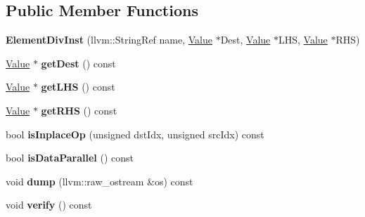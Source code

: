 \subsection*{Public Member Functions}
\begin{DoxyCompactItemize}
\item 
\mbox{\label{classglow_1_1_element_div_inst_ad0362c7e59fc139eaddf59c1a1543f28}} 
{\bfseries Element\+Div\+Inst} (llvm\+::\+String\+Ref name, \hyperlink{classglow_1_1_value}{Value} $\ast$Dest, \hyperlink{classglow_1_1_value}{Value} $\ast$L\+HS, \hyperlink{classglow_1_1_value}{Value} $\ast$R\+HS)
\item 
\mbox{\label{classglow_1_1_element_div_inst_a90fd08376f2deead72e2eb4b32d5426d}} 
\hyperlink{classglow_1_1_value}{Value} $\ast$ {\bfseries get\+Dest} () const
\item 
\mbox{\label{classglow_1_1_element_div_inst_ae241f42b7355bcf914e9592b4ee34b86}} 
\hyperlink{classglow_1_1_value}{Value} $\ast$ {\bfseries get\+L\+HS} () const
\item 
\mbox{\label{classglow_1_1_element_div_inst_a428924934a32c03ae303f97fc949d8ce}} 
\hyperlink{classglow_1_1_value}{Value} $\ast$ {\bfseries get\+R\+HS} () const
\item 
\mbox{\label{classglow_1_1_element_div_inst_a83f3cb9bf30f616b945cbd6c8ce4212e}} 
bool {\bfseries is\+Inplace\+Op} (unsigned dst\+Idx, unsigned src\+Idx) const
\item 
\mbox{\label{classglow_1_1_element_div_inst_aa0a83fb335d439a71e36f722e0c878b3}} 
bool {\bfseries is\+Data\+Parallel} () const
\item 
\mbox{\label{classglow_1_1_element_div_inst_aba1961df2691508c6a18c46bc777712a}} 
void {\bfseries dump} (llvm\+::raw\+\_\+ostream \&os) const
\item 
\mbox{\label{classglow_1_1_element_div_inst_a765ce7c610df683a9765285ed201df50}} 
void {\bfseries verify} () const
\end{DoxyCompactItemize}
